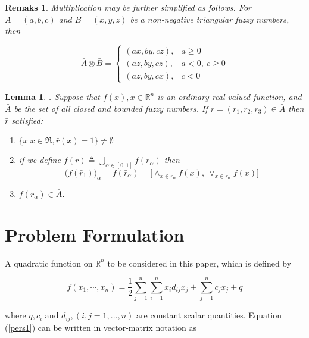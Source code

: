 \documentclass{iaesarticle3}
\newtheorem{rem}{Remaks}
\newtheorem{lem}{Lemma}
\begin{document}
\begin{rem}
    Multiplication may be further simplified as follows. For $\bar{A} = (a, b, c)$ and $\bar{B} = (x, y, z)$ be a non-negative triangular fuzzy numbers, then

    \begin{displaymath}
        \bar{A}\otimes \bar{B} =
        \left \{ \begin{array}{ll}
        (ax, by, cz),& a \geq 0 \\
        (az, by, cz), & a<0,\ c\geq 0\\
        (az, by, cx), & c<0
        \end{array} \right.
    \end{displaymath}
\end{rem}
\begin{lem}
    \cite{zoh}. Suppose that $f(x), x \in \mathbb{R}^n$ is an ordinary real valued function, and $\bar{A}$ be the set of all closed and bounded fuzzy numbers. If $\bar{r} =(r_1,r_2,r_3) \in \bar{A}$ then $\bar{r}$ satisfied:

\begin{enumerate}
    \item $\{x| x \in \Re, \bar{r}(x) = 1\} \neq \emptyset$
    \item if we define $f(\bar{r}) \triangleq \bigcup_{\alpha \in [0,1]}f(\bar{r}_\alpha)$ then
    \begin{displaymath}
        \Big(f(\bar{r}_1)\Big)_\alpha = f(\bar{r}_\alpha) = \Big[\wedge_{x \in \bar{r}_\alpha} f(x),\ \vee_{x\in \bar{r}_\alpha} f(x) \Big]
    \end{displaymath}
    \item $f(\bar{r}_\alpha) \in \bar{A}$.
\end{enumerate}
\end{lem}

\section{Problem Formulation}
A quadratic function on $\mathbb{R}^n$ to be considered in this paper, which is defined by

\begin{equation}\label{pers1}
    f(x_1,\cdots, x_n) = \frac{1}{2} \sum_{j=1}^n \sum_{i=1}^n x_id_{ij} x_j + \sum_{j=1}^nc_jx_j + q
\end{equation}

\noindent where $q, c_i$ and $d_{ij}, (i,j=1,...,n)$ are constant scalar quantities. Equation (\ref{pers1}) can be written in vector-matrix notation as
\end{document}

